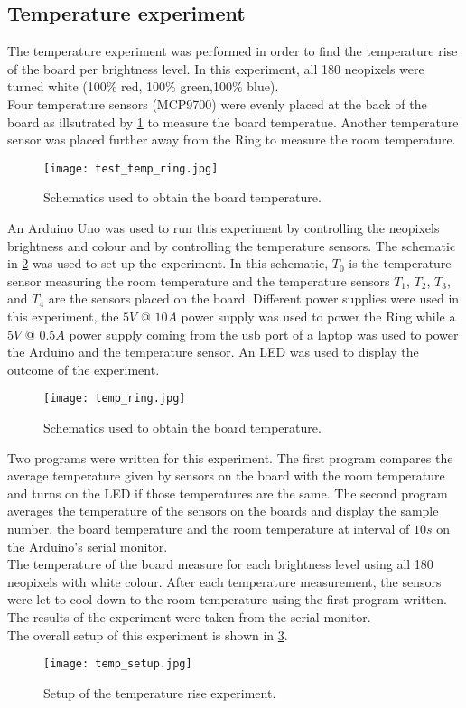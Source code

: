 \subsection{Temperature experiment}
The temperature experiment was performed in order to find the temperature rise of the board per brightness level. In this experiment, all 180 neopixels were turned white (100\% red, 100\% green,100\% blue). \\
Four temperature sensors (MCP9700) were evenly placed at the back of the board as illsutrated by \cref{fig:test_temp_ring} to measure the board temperatue. Another temperature sensor was placed further away from the Ring to measure the room temperature. 
\begin{figure}[ht]
	\centering
	\texttt{[image: test\_temp\_ring.jpg]}
	\caption{Schematics used to obtain the board temperature.}
	\label{fig:test_temp_ring}
\end{figure}
An Arduino Uno was used to run this experiment by controlling the neopixels brightness and colour and by controlling the temperature sensors. The schematic in \cref{fig:temp_ring} was used to set up the experiment. In this schematic, $T_0$ is the temperature sensor measuring the room temperature and the temperature sensors $T_1$, $T_2$, $T_3$, and $T_4$ are the sensors placed on the board. Different power supplies were used in this experiment, the $5V$ @ $10A$ power supply was used to power the Ring while a $5V$ @ $0.5A$ power supply coming from the usb port of a laptop was used to power the Arduino and the temperature sensor. An LED was used to display the outcome of the experiment.
\begin{figure}[h!]
	\centering
	\texttt{[image: temp\_ring.jpg]}
	\caption{Schematics used to obtain the board temperature.}
	\label{fig:temp_ring}
\end{figure}
Two programs were written for this experiment. The first program compares the average temperature given by sensors on the board with the room temperature and turns on the LED if those temperatures are the same. The second program averages the temperature of the sensors on the boards and display the sample number, the board temperature and the room temperature at interval of $10s$ on the Arduino's serial monitor.\\
The temperature of the board measure for each brightness level using all 180 neopixels with white colour. After each temperature measurement, the sensors were let to cool down to the room temperature using the first program written. The results of the experiment were taken from the serial monitor.\\
The overall setup of this experiment is shown in \ref{fig:temp_setup}.
\begin{figure}[h!]
	\centering
	\texttt{[image: temp\_setup.jpg]}
	\caption{Setup of the temperature rise experiment.}
	\label{fig:temp_setup}
\end{figure}

